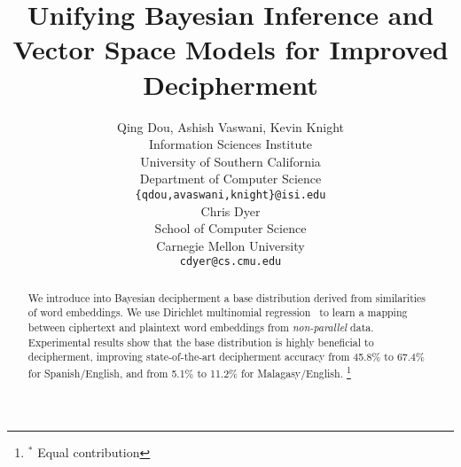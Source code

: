 \documentclass[11pt]{article}
\title{Unifying Bayesian Inference and Vector Space Models for Improved Decipherment}
\author{
Qing Dou\rlap{$^\ast$}, Ashish Vaswani\rlap{$^\ast$}, Kevin Knight \\
Information Sciences Institute \\
University of Southern California \\
Department of Computer Science \\
{\tt \{qdou,avaswani,knight\}@isi.edu}  \\
\AND
Chris Dyer \\
School of Computer Science \\
Carnegie Mellon University \\
{\tt cdyer@cs.cmu.edu} \\
}
\date{}
\begin{document}
\maketitle
\begin{abstract}
We introduce into Bayesian decipherment a base distribution derived from similarities of word embeddings. We use Dirichlet multinomial regression~\cite{mimno2012topic} to learn a mapping between ciphertext and plaintext word embeddings from \emph{non-parallel} data. Experimental results show that the base distribution is highly beneficial to decipherment, improving state-of-the-art decipherment accuracy from 45.8\% to 67.4\% for Spanish/English, and from 5.1\% to 11.2\% for Malagasy/English. %
\let\thefootnote\relax\footnote{$^\ast$ Equal contribution}

 
\end{abstract}




%
%








\end{document}

